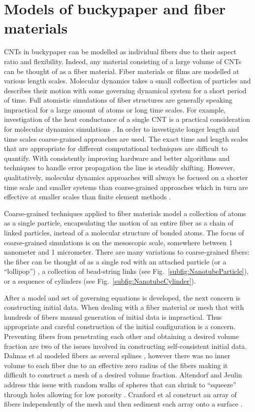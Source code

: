 \section{Models of buckypaper and fiber materials}

	CNTs in buckypaper can be modelled as individual fibers due to their aspect ratio and flexibility. Indeed, any material consisting of a large volume of CNTs can be thought of as a fiber material. Fiber materials or films are modelled at various length scales. Molecular dynamics takes a small collection of particles and describes their motion with some governing dynamical system for a short period of time. Full atomistic simulations of fiber structures are generally speaking impractical for a large amount of atoms or long time scales. For example, investigation of the heat conductance of a single CNT is a practical consideration for molecular dynamics simulations \cite{Maruyama2003}. In order to investigate longer length and time scales coarse-grained approaches are used. The exact time and length scales that are appropriate for different computational techniques are difficult to quantify. With consistently improving hardware and better algorithms and techniques to handle error propagation the line is steadily shifting. However, qualitatively, molecular dynamics approaches will always be focused on a shorter time scale and smaller systems than coarse-grained approaches which in turn are effective at smaller scales than finite element methods \cite{Muller2002}.
	
	Coarse-grained techniques applied to fiber materials model a collection of atoms as a single particle, encapsulating the motion of an entire fiber as a chain of linked particles, instead of a molecular structure of bonded atoms. The focus of coarse-grained simulations is on the mesoscopic scale, somewhere between 1 nanometer and 1 micrometer.  There are many variations to coarse-grained fibers: the fiber can be thought of as a single rod with an attached particle (or a ``lollipop'') \cite{Buehler2006}, a collection of bead-string links \cite{Li2012} (see Fig.~\ref{subfig:NanotubeParticle}), or a sequence of cylinders \cite{Volkov2008} (see Fig.~\ref{subfig:NanotubeCylinder}).
	
	After a model and set of governing equations is developed, the next concern is constructing initial data. When dealing with a fiber material or mesh that with hundreds of fibers manual generation of initial data is impractical. Thus appropriate and careful construction of the initial configuration is a concern. Preventing fibers from penetrating each other and obtaining a desired volume fraction are two of the issues involved in constructing self-consistent initial data. Dalmas et al modeled fibers as several splines \cite{Dalmas2006}, however there was no inner volume to each fiber due to an effective zero radius of the fibers making it difficult to construct a mesh of a desired volume fraction. Altendorf and Jeulin address this issue with random walks of spheres that can shrink to ``squeeze'' through holes allowing for low porosity \cite{Altendorf2011}. Cranford et al construct an array of fibers independently of the mesh and then sediment each array onto a surface \cite{Cranford2010}.
	
